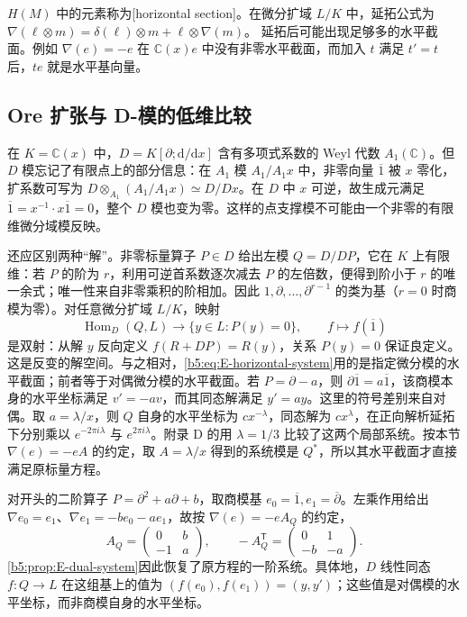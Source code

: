 \(H(M)\) 中的元素称为[horizontal section]。在微分扩域 \(L/K\) 中，延拓公式为 \(\nabla(\ell\otimes m)=\delta(\ell)\otimes m+\ell\otimes\nabla(m)\)。 延拓后可能出现足够多的水平截面。例如 \(\nabla(e)=-e\) 在 \(\mathbb C(x)e\) 中没有非零水平截面，而加入 \(t\) 满足 \(t'=t\) 后，\(te\) 就是水平基向量。

\subsection{Ore 扩张与 D-模的低维比较}
\label{b5:subsec:E01:03}

在 \(K=\mathbb C(x)\) 中，\(D=K[\partial;\mathrm{d}/\mathrm{d}x]\) 含有多项式系数的 Weyl 代数 \(A_1(\mathbb C)\)。但 \(D\) 模忘记了有限点上的部分信息：在 \(A_1\) 模 \(A_1/A_1x\) 中，非零向量 \(\overline1\) 被 \(x\) 零化，扩系数可写为 \(D\otimes_{A_1}(A_1/A_1x)\simeq D/Dx\)。在 \(D\) 中 \(x\) 可逆，故生成元满足 \(\overline1=x^{-1}\cdot x\overline1=0\)，整个 \(D\) 模也变为零。这样的点支撑模不可能由一个非零的有限维微分域模反映。

\ProseParagraphBreak
还应区别两种“解”。非零标量算子 \(P\in D\) 给出左模 \(Q=D/DP\)，它在 \(K\) 上有限维：若 \(P\) 的阶为 \(r\)，利用可逆首系数逐次减去 \(P\) 的左倍数，便得到阶小于 \(r\) 的唯一余式；唯一性来自非零乘积的阶相加。因此 \(1,\partial,\ldots,\partial^{r-1}\) 的类为基（\(r=0\) 时商模为零）。对任意微分扩域 \(L/K\)，映射
\[
	\operatorname{Hom}_D(Q,L)\longrightarrow\bigl\{y\in L:P(y)=0\bigr\}, \qquad f\longmapsto f(\overline1)
\]
是双射：从解 \(y\) 反向定义 \(f(R+DP)=R(y)\)，关系 \(P(y)=0\) 保证良定义。这是反变的解空间。与之相对，\eqref{b5:eq:E-horizontal-system}用的是指定微分模的水平截面；前者等于对偶微分模的水平截面。若 \(P=\partial-a\)，则 \(\partial\overline1=a\overline1\)，该商模本身的水平坐标满足 \(v'=-av\)，而其同态解满足 \(y'=ay\)。这里的符号差别来自对偶。取 \(a=\lambda/x\)，则 \(Q\) 自身的水平坐标为 \(cx^{-\lambda}\)，同态解为 \(cx^\lambda\)，在正向解析延拓下分别乘以 \(e^{-2\pi i\lambda}\) 与 \(e^{2\pi i\lambda}\)。附录 D 的用 \(\lambda=1/3\) 比较了这两个局部系统。按本节 \(\nabla(e)=-eA\) 的约定，取 \(A=\lambda/x\) 得到的系统模是 \(Q^*\)，所以其水平截面才直接满足原标量方程。

\ProseParagraphBreak
对开头的二阶算子 \(P=\partial^2+a\partial+b\)，取商模基 \(e_0=\overline1,e_1=\overline\partial\)。左乘作用给出 \(\nabla e_0=e_1\)、\(\nabla e_1=-be_0-ae_1\)，故按 \(\nabla(e)=-eA_Q\) 的约定，
\[
	A_Q=\begin{pmatrix}0&b\\-1&a\end{pmatrix},
	\qquad -A_Q^{\mathsf T}=\begin{pmatrix}0&1\\-b&-a\end{pmatrix}.
\]
\cref{b5:prop:E-dual-system}因此恢复了原方程的一阶系统。具体地，\(D\) 线性同态 \(f:Q\to L\) 在这组基上的值为 \((f(e_0),f(e_1))=(y,y')\)；这些值是对偶模的水平坐标，而非商模自身的水平坐标。
